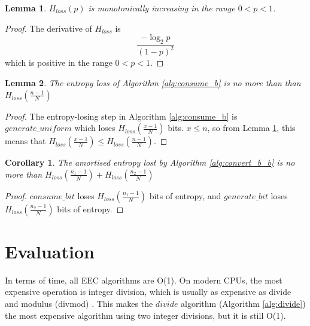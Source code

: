 \documentclass[12pt]{article}
\newtheorem{lemma}{Lemma}
\newtheorem{corollary}{Corollary}
\begin{document}
\begin{lemma}
    \label{lem:hloss_monotonic}
    $H_{loss}(p)$ is monotonically increasing in the range $0 < p < 1$.
\end{lemma}

\begin{proof}The derivative of $H_{loss}$ is
    \begin{equation}
        \frac{-\log_2p}{(1-p)^2}
    \end{equation}
    which is positive in the range $0 < p < 1$.
\end{proof}

\begin{lemma}
The entropy loss of Algorithm \ref{alg:consume_b} is no more than than $H_{loss}(\frac{n-1}{N})$
\end{lemma}

\begin{proof}
    The entropy-losing step in Algorithm \ref{alg:consume_b} is $generate\_uniform$ which loses $H_{loss}(\frac{x-1}{N})$ bits. $x \le n$, so from Lemma \ref{lem:hloss_monotonic}, this means that $H_{loss}(\frac{x-1}{N}) \le H_{loss}(\frac{n-1}{N})$.
\end{proof}

\begin{corollary}
The amortised entropy lost by Algorithm \ref{alg:convert_b_b} is no more than $H_{loss}(\frac{n_1-1}{N}) + H_{loss}(\frac{n_2-1}{N})$
\end{corollary}

\begin{proof}
    $consume\_bit$ loses $H_{loss}(\frac{n_1-1}{N})$ bits of entropy, and $generate\_bit$ loses $H_{loss}(\frac{n_2-1}{N})$ bits of entropy.
\end{proof}









\section {Evaluation}


In terms of time, all EEC algorithms are O(1). On modern CPUs, the most expensive operation is integer division, which is usually as expensive as divide and modulus (divmod) \cite{cpudivmod}. This makes the $divide$ algorithm (Algorithm \ref{alg:divide}) the most expensive algorithm using two integer divisions, but it is still O(1).
\end{document}
